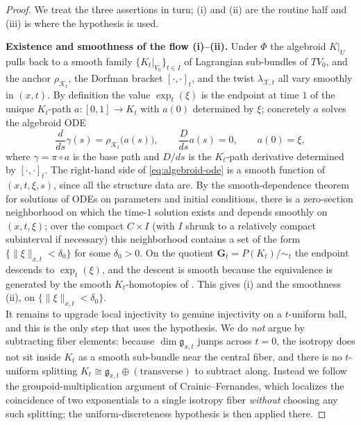 \documentclass[reqno]{amsart}
\theoremstyle{plain}
\theoremstyle{definition}
\newcommand{\g}{\mathfrak{g}}
\newcommand{\X}{\mathcal{X}}
\newcommand{\Kt}{K_t}
\newcommand{\expt}{\exp_t}
\newcommand{\K}{\mathcal{K}}
\begin{document}
\begin{proof}
We treat the three assertions in turn; (i) and (ii) are the routine half and (iii) is where the hypothesis is used.
 
\textbf{Existence and smoothness of the flow (i)--(ii).}
Under $\Phi$ the algebroid $K|_U$ pulls back to a smooth family
$\{\Kt|_{V_0}\}_{t\in I}$ of Lagrangian sub-bundles of $TV_0$, and the anchor $\rho_{\K_t}$, the Dorfman bracket $[\cdot,\cdot]_t$, and the twist $\lambda_{\X,t}$ all vary smoothly in $(x,t)$. By definition the value $\expt(\xi)$ is the endpoint at time $1$ of the unique $\Kt$-path $a\colon[0,1]\to\Kt$ with $a(0)$ determined by $\xi$; concretely $a$ solves the
algebroid ODE
\begin{equation}\label{eq:algebroid-ode}
  \frac{d}{ds}\gamma(s)=\rho_{\K_t}\bigl(a(s)\bigr),\qquad
  \frac{D}{ds}a(s)=0,\qquad a(0)=\xi,
\end{equation}
where $\gamma = \pi\circ a$ is the base path and $D/ds$ is the $\Kt$-path derivative determined by $[\cdot,\cdot]_t$. The right-hand side of \eqref{eq:algebroid-ode} is a smooth function of $(x,t,\xi,s)$, since all the structure data are. By the smooth-dependence theorem for solutions of ODEs on
parameters and initial conditions, there is a zero-section neighborhood on which the time-$1$ solution exists and depends smoothly on $(x,t,\xi)$; over the
compact $C\times I$ (with $I$ shrunk to a relatively compact subinterval if necessary) this neighborhood contains a set of the form $\{\|\xi\|_{x,t}<\delta_0\}$ for some $\delta_0>0$. On the quotient $\mathbf{G}_t = P(\Kt)/\!\sim_t$ the endpoint descends to $\expt(\xi)$, and the descent is smooth because the equivalence is generated by the smooth $\Kt$-homotopies of
\cite{crainic2003integrability}. This gives (i) and the smoothness (ii), on $\{\|\xi\|_{x,t}<\delta_0\}$.\\ 

It remains to upgrade local injectivity to genuine injectivity on a
$t$-uniform ball, and this is the only step that uses the hypothesis. We do \emph{not} argue by subtracting fiber elements: because $\dim \g_{x,t}$ jumps across $t=0$, the isotropy does not sit inside $\Kt$ as a smooth sub-bundle near the central fiber, and there is no $t$-uniform splitting
$\Kt \cong \mathfrak{g}_{x,t}\oplus(\text{transverse})$ to subtract along.
Instead we follow the groupoid-multiplication argument of
Crainic--Fernandes, which localizes the coincidence of two exponentials to a single isotropy fiber \emph{without} choosing any such splitting; the uniform-discreteness hypothesis is then applied there.


\end{proof}
\end{document}
